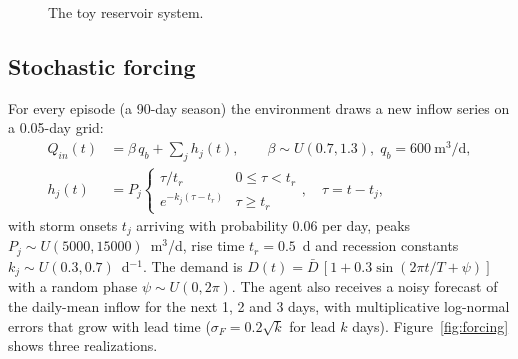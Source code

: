 \documentclass[11pt]{article}
\newcommand{\Scap}{S_{\mathrm{cap}}}
\newcommand{\Qsafe}{Q_{\mathrm{safe}}}
\begin{document}
\begin{figure}[h]
\centering
{}
\caption{The toy reservoir system.}
\label{fig:schematic}
\end{figure}

\subsection{Stochastic forcing}
For every episode (a 90-day season) the environment draws a new inflow
series on a 0.05-day grid:
\begin{align}
Q_{in}(t) &= \beta\,q_b + \sum_{j} h_j(t), \qquad \beta\sim U(0.7,1.3),\; q_b = 600~\text{m}^3/\text{d},\\
h_j(t) &= P_j\begin{cases} \tau/t_r & 0\le\tau<t_r\\ e^{-k_j(\tau-t_r)} & \tau\ge t_r\end{cases},\quad \tau=t-t_j,
\end{align}
with storm onsets $t_j$ arriving with probability $0.06$ per day, peaks
$P_j\sim U(5000,15000)$~m$^3$/d, rise time $t_r=0.5$~d and recession
constants $k_j\sim U(0.3,0.7)$~d$^{-1}$. The demand is
$D(t)=\bar D\,[1+0.3\sin(2\pi t/T+\psi)]$ with a random phase $\psi\sim U(0,2\pi)$. The
agent also receives a noisy forecast of the daily-mean inflow for the next
1, 2 and 3 days, with multiplicative log-normal errors that grow with lead
time ($\sigma_F=0.2\sqrt{k}$ for lead $k$ days). Figure~\ref{fig:forcing} shows
three realizations.
\end{document}
